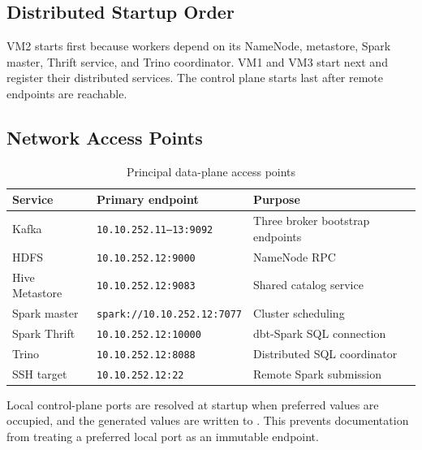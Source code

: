 \subsection{Distributed Startup Order}
VM2 starts first because workers depend on its NameNode, metastore, Spark master, Thrift service, and Trino coordinator. VM1 and VM3 start next and register their distributed services. The control plane starts last after remote endpoints are reachable.

\subsection{Network Access Points}
\begin{table}[htbp]
    \centering
    \footnotesize
    \begin{tabularx}{\textwidth}{|p{}|p{}|X|}
        \hline
        \rowcolor{ModernTableHeader}
        \color{white}\textbf{Service} & \color{white}\textbf{Primary endpoint} & \color{white}\textbf{Purpose} \\
        \hline
        Kafka & \texttt{10.10.252.11--13:9092} & Three broker bootstrap endpoints \\
        \hline
        HDFS & \texttt{10.10.252.12:9000} & NameNode RPC \\
        \hline
        Hive Metastore & \texttt{10.10.252.12:9083} & Shared catalog service \\
        \hline
        Spark master & \texttt{spark://10.10.252.12:7077} & Cluster scheduling \\
        \hline
        Spark Thrift & \texttt{10.10.252.12:10000} & dbt-Spark SQL connection \\
        \hline
        Trino & \texttt{10.10.252.12:8088} & Distributed SQL coordinator \\
        \hline
        SSH target & \texttt{10.10.252.12:22} & Remote Spark submission \\
        \hline
    \end{tabularx}
    \caption{Principal data-plane access points}
    \label{tab:implementation-primary-endpoints}
\end{table}
Local control-plane ports are resolved at startup when preferred values are occupied, and the generated values are written to . This prevents documentation from treating a preferred local port as an immutable endpoint.

